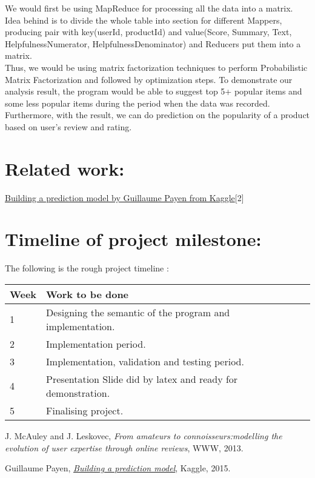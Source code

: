\documentclass[12pt]{article}
\begin{document}
We would first be using MapReduce for processing all the data into a matrix. Idea behind is to divide the whole table into section for different Mappers, producing pair with key(userId, productId) and value(Score, Summary, Text, HelpfulnessNumerator, HelpfulnessDenominator) and Reducers put them into a matrix.\\

Thus, we would be using matrix factorization techniques to perform Probabilistic Matrix Factorization and followed by optimization steps.
To demonstrate our analysis result, the program would be able to suggest top 5+ popular items and some less popular items during the period when the data was recorded. Furthermore, with the result, we can do prediction on the popularity of a product based on user's review and rating.

\section{Related work:}
\href{https://www.kaggle.com/gpayen/building-a-prediction-model}{Building a prediction model by Guillaume Payen from Kaggle}[2]
\section{Timeline of project milestone:}
The following is the rough project timeline :
\begin{center}
    \begin{tabular}{| l | l | l | l |}
    \hline
    Week & Work to be done \\ \hline
    1 &  Designing the semantic of the program and implementation.\\ \hline
    2 &  Implementation period.\\ \hline
    3 &  Implementation, validation and testing period.\\ \hline
    4 &  Presentation Slide did by latex and ready for demonstration. \\ \hline
    5 &  Finalising project. \\ \hline
    
    \end{tabular}
\end{center}


\begin{thebibliography}{1}

	J. McAuley and J. Leskovec,
	{\em From amateurs to connoisseurs:modelling the evolution of user expertise through online reviews},
	WWW,
	2013.
	
	Guillaume Payen,
	\href{https://www.kaggle.com/gpayen/building-a-prediction-model}{{\em Building a prediction model}},
	Kaggle,
	2015.

\end{thebibliography}
\end{document}
